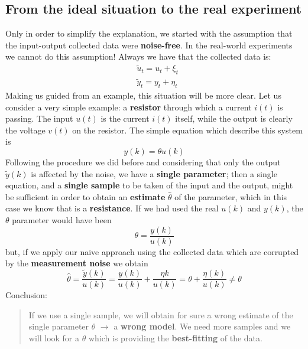\subsection{From the ideal situation to the real experiment}
Only in order to simplify the explanation, we started with the assumption that the input-output collected data were \textbf{noise-free}. In the real-world experiments we cannot do this assumption! Always we have that the collected data is:
\begin{align}
    &\tilde{u}_t = u_t+\xi_t\\
    &\tilde{y}_t = y_t+\eta_t
\end{align}
Making us guided from an example, this situation will be more clear. Let us consider a very simple  example: a \textbf{resistor} through which a current $i(t)$ is passing. The input $u(t)$ is the current $i(t)$ itself, while the output is clearly the voltage $v(t)$ on the resistor. The simple equation which describe this system is 
\begin{equation}
    y(k) = \theta u(k)
\end{equation}
Following the procedure we did before and considering that only the output $\tilde{y}(k)$ is affected by the noise, we have a \textbf{single parameter}; then a single equation, and a \textbf{single sample} to be taken of the input and the output, might be sufficient in order to obtain an \textbf{estimate} $\hat{\theta}$ of the parameter, which in this case we know that is a \textbf{resistance}.
If we had used the real $u(k)$ and $y(k)$, the $\theta$ parameter would have been
\begin{equation}
    \theta = \frac{y(k)}{u(k)}
\end{equation}
but, if we apply our naive approach using the collected data which are corrupted by the \textbf{measurement noise} we obtain
\begin{equation}
    \hat{\theta} = \frac{\tilde{y}(k)}{u(k)} = 
    \frac{y(k)}{u(k)}+\frac{\eta{k}}{u(k)} = \theta + \frac{\eta(k)}{u(k)} \ne \theta
\end{equation}
Conclusion:
\begin{quotation}
    If we use a single sample, we will obtain for sure a wrong estimate of the single parameter $\theta$ $\to$ a \textbf{wrong model}. We need more samples and we will look for a $\theta$ which is providing the \textbf{best-fitting} of the data.
\end{quotation}





